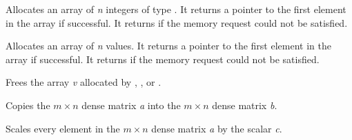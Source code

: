 \documentclass[letterpaper,10pt,english]{sphinxmanual}
\begin{document}
\begin{fulllineitems}
\label{linear_solvers/DLS:newIntArray}
Allocates an array of \emph{n} integers of type .  It returns a
pointer to the first element in the array if successful. It returns
 if the memory request could not be satisfied.

\end{fulllineitems}


\begin{fulllineitems}
\label{linear_solvers/DLS:newRealArray}
Allocates an array of \emph{n}  values. It returns a pointer
to the first element in the array if successful. It returns
 if the memory request could not be satisfied.

\end{fulllineitems}


\begin{fulllineitems}
\label{linear_solvers/DLS:destroyArray}
Frees the array \emph{v} allocated by {\hyperref[linear_solvers/DLS:newLintArray]{}},
{\hyperref[linear_solvers/DLS:newIntArray]{}}, or {\hyperref[linear_solvers/DLS:newRealArray]{}}.

\end{fulllineitems}


\begin{fulllineitems}
\label{linear_solvers/DLS:denseCopy}
Copies the $m \times n$ dense matrix \emph{a} into the $m
\times n$ dense matrix \emph{b}.

\end{fulllineitems}


\begin{fulllineitems}
\label{linear_solvers/DLS:denseScale}
Scales every element in the $m \times n$ dense matrix \emph{a} by
the scalar \emph{c}.

\end{fulllineitems}
\end{document}

